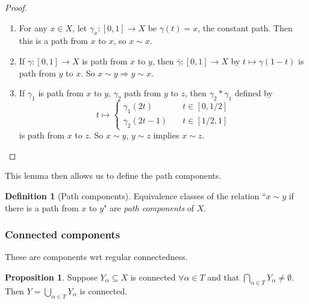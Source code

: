 \documentclass[a4paper,11pt]{article}
\theoremstyle{definition}
\newtheorem*{defn}{Definition}
\newtheorem*{prop}{Proposition}
\numberwithin{equation}{section}
\begin{document}
\begin{proof}
\leavevmode
\begin{enumerate}
    \item For any $x\in X$, let $\gamma_x:[0,1]\rightarrow X$ be $\gamma(t)=x$, the constant path. Then this is a path from $x$ to $x$, so $x\sim x$.
    \item If $\gamma:[0,1]\rightarrow X$ is path from $x$ to $y$, then $\bar{\gamma}:[0,1]\rightarrow X$ by $t\mapsto\gamma(1-t)$ is path from $y$ to $x$. So $x\sim y\Rightarrow y\sim x$.
    \item If $\gamma_1$ is path from $x$ to $y$, $\gamma_2$ path from $y$ to $z$, then $\gamma_2*\gamma_1$ defined by
    \[
    t\mapsto\left\{\begin{array}{lr}
        \gamma_1(2t)\quad & t\in[0,1/2] \\
        \gamma_2(2t-1)\quad & t\in[1/2,1]
    \end{array}\right.
    \] is path from $x$ to $z$. So $x\sim y$, $y\sim z$ implies $x\sim z$.
    \end{enumerate}
\end{proof}

This lemma then allows us to define the path components.
\begin{defn}[Path components]
    Equivalence classes of the relation ``$x\sim y$ if there is a path from $x$ to $y$" are \emph{path components} of $X$.
\end{defn}

\subsubsection{Connected components}
These are components wrt regular connectedness.
\begin{prop}
    Suppose $Y_\alpha\subseteq X$ is connected $\forall\alpha\in T$ and that $\bigcap_{\alpha\in T}Y_\alpha\neq\emptyset$. Then $Y=\bigcup_{\alpha\in T}Y_\alpha$ is connected.
\end{prop}
\end{document}
